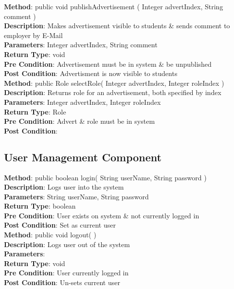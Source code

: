 \documentclass{l3deliverable}
\begin{document}
\textbf{Method}: public void publishAdvertisement ( Integer advertIndex, String comment )\\
\textbf{Description}: Makes advertisement visible to students \& sends comment to employer by E-Mail\\
\textbf{Parameters}: Integer advertIndex, String comment\\
\textbf{Return Type}: void\\
\textbf{Pre Condition}: Advertisement must be in system \& be unpublished\\
\textbf{Post Condition}: Advertisment is now visible to students\\

\textbf{Method}: public Role selectRole( Integer advertIndex, Integer roleIndex )\\
\textbf{Description}: Returns role for an advertisement, both specified by index\\
\textbf{Parameters}: Integer advertIndex, Integer roleIndex\\
\textbf{Return Type}: Role\\
\textbf{Pre Condition}: Advert \& role must be in system\\
\textbf{Post Condition}:\\


\subsection{User Management Component}
\textbf{Method}: public boolean login( String userName, String password )\\
\textbf{Description}: Logs user into the system\\
\textbf{Parameters}: String userName, String password\\
\textbf{Return Type}: boolean\\
\textbf{Pre Condition}: User exists on system \& not currently logged in\\
\textbf{Post Condition}: Set as current user\\

\textbf{Method}: public void logout( )\\
\textbf{Description}: Logs user out of the system\\
\textbf{Parameters}:\\
\textbf{Return Type}: void\\
\textbf{Pre Condition}: User currently logged in\\
\textbf{Post Condition}: Un-sets current user\\
\end{document}
